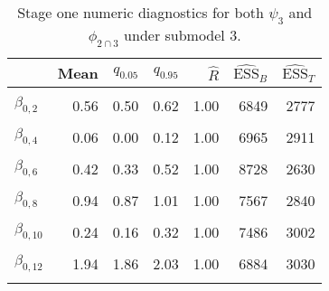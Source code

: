 \begin{table}

\caption{\label{tab:surv-stage-one-submodel-three}Stage one numeric diagnostics for both $\psi_{3}$ and $\phi_{2 \cap 3}$ under submodel 3.}
\centering
\begin{tabular}[t]{lrrrrrr}
\toprule
  & Mean & $q_{0.05}$ & $q_{0.95}$ & $\widehat{R}$ & $\widehat{\text{ESS}}_{B}$ & $\widehat{\text{ESS}}_{T}$\\
\midrule
\cellcolor{gray!6}{$\beta_{0, 1}$} & \cellcolor{gray!6}{0.14} & \cellcolor{gray!6}{0.07} & \cellcolor{gray!6}{0.21} & \cellcolor{gray!6}{1.00} & \cellcolor{gray!6}{6412} & \cellcolor{gray!6}{2745}\\
$\beta_{0, 2}$ & 0.56 & 0.50 & 0.62 & 1.00 & 6849 & 2777\\
\cellcolor{gray!6}{$\beta_{0, 3}$} & \cellcolor{gray!6}{0.25} & \cellcolor{gray!6}{0.16} & \cellcolor{gray!6}{0.34} & \cellcolor{gray!6}{1.00} & \cellcolor{gray!6}{7396} & \cellcolor{gray!6}{2696}\\
$\beta_{0, 4}$ & 0.06 & 0.00 & 0.12 & 1.00 & 6965 & 2911\\
\cellcolor{gray!6}{$\beta_{0, 5}$} & \cellcolor{gray!6}{0.30} & \cellcolor{gray!6}{0.24} & \cellcolor{gray!6}{0.37} & \cellcolor{gray!6}{1.00} & \cellcolor{gray!6}{7746} & \cellcolor{gray!6}{3052}\\
$\beta_{0, 6}$ & 0.42 & 0.33 & 0.52 & 1.00 & 8728 & 2630\\
\cellcolor{gray!6}{$\beta_{0, 7}$} & \cellcolor{gray!6}{1.73} & \cellcolor{gray!6}{1.66} & \cellcolor{gray!6}{1.80} & \cellcolor{gray!6}{1.00} & \cellcolor{gray!6}{8561} & \cellcolor{gray!6}{2832}\\
$\beta_{0, 8}$ & 0.94 & 0.87 & 1.01 & 1.00 & 7567 & 2840\\
\cellcolor{gray!6}{$\beta_{0, 9}$} & \cellcolor{gray!6}{0.78} & \cellcolor{gray!6}{0.70} & \cellcolor{gray!6}{0.85} & \cellcolor{gray!6}{1.00} & \cellcolor{gray!6}{6353} & \cellcolor{gray!6}{2678}\\
$\beta_{0, 10}$ & 0.24 & 0.16 & 0.32 & 1.00 & 7486 & 3002\\
\cellcolor{gray!6}{$\beta_{0, 11}$} & \cellcolor{gray!6}{0.56} & \cellcolor{gray!6}{0.49} & \cellcolor{gray!6}{0.64} & \cellcolor{gray!6}{1.00} & \cellcolor{gray!6}{8098} & \cellcolor{gray!6}{2611}\\
$\beta_{0, 12}$ & 1.94 & 1.86 & 2.03 & 1.00 & 6884 & 3030\\
\cellcolor{gray!6}{$\beta_{0, 13}$} & \cellcolor{gray!6}{0.67} & \cellcolor{gray!6}{0.61} & \cellcolor{gray!6}{0.73} & \cellcolor{gray!6}{1.00} & \cellcolor{gray!6}{6860} & \cellcolor{gray!6}{3004}\\

\end{tabular}
\end{table}
